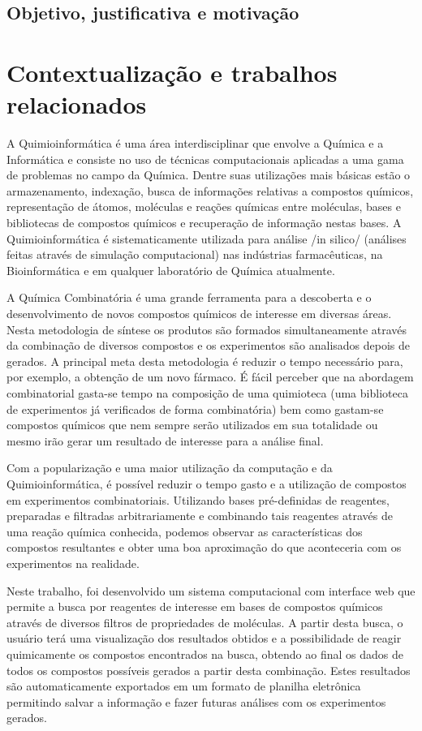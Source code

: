 \documentclass{abnt}
\begin{document}
\section{Objetivo, justificativa e motivação}

\chapter{Contextualização e trabalhos relacionados}

A Quimioinformática é uma área interdisciplinar que envolve a Química e a Informática e consiste no uso de técnicas computacionais aplicadas a uma gama de problemas no campo da Química. Dentre suas utilizações mais básicas estão o armazenamento, indexação, busca de informações relativas a compostos químicos, representação de átomos, moléculas e reações químicas entre moléculas, bases e bibliotecas de compostos químicos e recuperação de informação nestas bases. A Quimioinformática é sistematicamente utilizada para análise /in silico/ (análises feitas através de simulação computacional) nas indústrias farmacêuticas, na Bioinformática e em qualquer laboratório de Química atualmente.

A Química Combinatória é uma grande ferramenta para a descoberta e o desenvolvimento de novos compostos químicos de interesse em diversas áreas. Nesta metodologia de síntese os produtos são formados simultaneamente através da combinação de diversos compostos e os experimentos são analisados depois de gerados. A principal meta desta metodologia é reduzir o tempo necessário para, por exemplo, a obtenção de um novo fármaco. É fácil perceber que na abordagem combinatorial gasta-se tempo na composição de uma quimioteca (uma biblioteca de experimentos já verificados de forma combinatória) bem como gastam-se compostos químicos que nem sempre serão utilizados em sua totalidade ou mesmo irão gerar um resultado de interesse para a análise final.

Com a popularização e uma maior utilização da computação e da Quimioinformática, é possível reduzir o tempo gasto e a utilização de compostos em experimentos combinatoriais. Utilizando bases pré-definidas de reagentes, preparadas e filtradas arbitrariamente e combinando tais reagentes através de uma reação química conhecida, podemos observar as características dos compostos resultantes e obter uma boa aproximação do que aconteceria com os experimentos na realidade.

Neste trabalho, foi desenvolvido um sistema computacional com interface web que permite a busca por reagentes de interesse em bases de compostos químicos através de diversos filtros de propriedades de moléculas. A partir desta busca, o usuário terá uma visualização dos resultados obtidos e a possibilidade de reagir quimicamente os compostos encontrados na busca, obtendo ao final os dados de todos os compostos possíveis gerados a partir desta combinação. Estes resultados são automaticamente exportados em um formato de planilha eletrônica permitindo salvar a informação e fazer futuras análises com os experimentos gerados.
\end{document}
